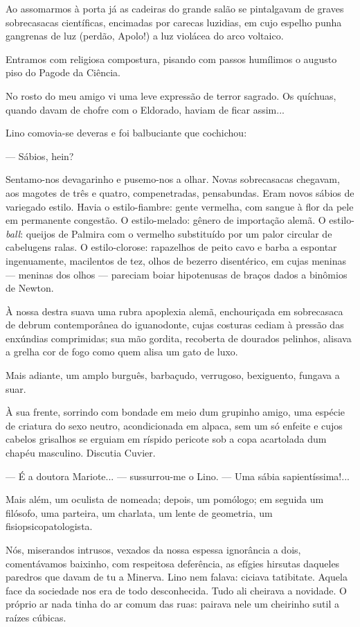 Ao assomarmos à porta já as cadeiras do grande salão se pintalgavam de
graves sobrecasacas científicas, encimadas por carecas luzidias, em cujo
espelho punha gangrenas de luz (perdão, Apolo!) a luz violácea do arco
voltaico.

Entramos com religiosa compostura, pisando com passos humílimos o
augusto piso do Pagode da Ciência.

No rosto do meu amigo vi uma leve expressão de terror sagrado. Os
quíchuas, quando davam de chofre com o Eldorado, haviam de ficar
assim...

Lino comovia-se deveras e foi balbuciante que cochichou:

--- Sábios, hein?

Sentamo-nos devagarinho e pusemo-nos a olhar. Novas sobrecasacas
chegavam, aos magotes de três e quatro, compenetradas, pensabundas. Eram
novos sábios de variegado estilo. Havia o estilo-fiambre: gente
vermelha, com sangue à flor da pele em permanente congestão. O
estilo-melado: gênero de importação alemã. O estilo-\emph{ball}: queijos
de Palmira com o vermelho substituído por um palor circular de
cabelugens ralas. O estilo-clorose: rapazelhos de peito cavo e barba a
espontar ingenuamente, macilentos de tez, olhos de bezerro disentérico,
em cujas meninas --- meninas dos olhos --- pareciam boiar hipotenusas de
braços dados a binômios de Newton.

À nossa destra suava uma rubra apoplexia alemã, enchouriçada em
sobrecasaca de debrum contemporânea do iguanodonte, cujas costuras
cediam à pressão das enxúndias comprimidas; sua mão gordita, recoberta
de dourados pelinhos, alisava a grelha cor de fogo como quem alisa um
gato de luxo.

Mais adiante, um amplo burguês, barbaçudo, verrugoso, bexiguento,
fungava a suar.

À sua frente, sorrindo com bondade em meio dum grupinho amigo, uma
espécie de criatura do sexo neutro, acondicionada em alpaca, sem um só
enfeite e cujos cabelos grisalhos se erguiam em ríspido pericote sob a
copa acartolada dum chapéu masculino. Discutia Cuvier.

--- É a doutora Mariote... --- sussurrou-me o Lino. --- Uma sábia
sapientíssima!...

Mais além, um oculista de nomeada; depois, um pomólogo; em seguida um
filósofo, uma parteira, um charlata, um lente de geometria, um
fisiopsicopatologista.

Nós, miserandos intrusos, vexados da nossa espessa ignorância a dois,
comentávamos baixinho, com respeitosa deferência, as efígies hirsutas
daqueles paredros que davam de tu a Minerva. Lino nem falava: ciciava
tatibitate. Aquela face da sociedade nos era de todo desconhecida. Tudo
ali cheirava a novidade. O próprio ar nada tinha do ar comum das ruas:
pairava nele um cheirinho sutil a raízes cúbicas.


